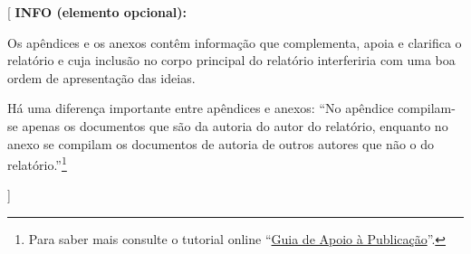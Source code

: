 \documentclass[11pt,a4paper]{report}
\newenvironment{infoopt}[1]{\vspace*{6mm}\color{blue}[ \textbf{INFO (elemento opcional):} \begin{em} #1}{\vspace*{3mm}\end{em} ]}
\begin{document}
\begin{infoopt}
Os apêndices e os anexos contêm informação que complementa, apoia e
clarifica o relatório e cuja inclusão no corpo principal do relatório
interferiria com uma boa ordem de apresentação das ideias.

Há uma diferença importante entre apêndices e anexos: ``No apêndice
compilam-se apenas os documentos que são da autoria do autor do
relatório, enquanto no anexo se compilam os documentos de autoria de
outros autores que não o do relatório.''\footnote{%
Para saber mais consulte o tutorial online 
``\href{https://docs.google.com/document/d/1TDC1behVq8x7fQL4CcPEEh_np5GXviJevQxnQ9gbiJs/edit}
{Guia de Apoio à Publicação}''.}
\end{infoopt}

\end{document}
